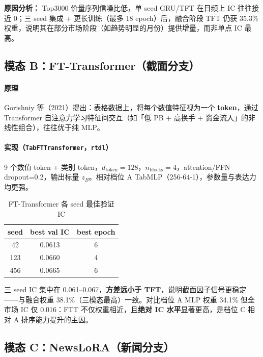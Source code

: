 \documentclass[UTF8,a4paper,12pt]{ctexart}
\begin{document}
\textbf{原因分析：} Top3000 价量序列信噪比低，单 seed GRU/TFT 在日频上 IC 往往接近 0；三 seed 集成 + 更长训练（最多 18 epoch）后，融合阶段 TFT 仍获 35.3\% 权重，说明其在部分市场阶段（如趋势明显的月份）提供增量，而非单点 IC 最高。

\subsection{模态 B：FT-Transformer（截面分支）}

\paragraph{原理}

Gorishniy 等（2021）提出：表格数据上，将每个数值特征视为一个 \textbf{token}，通过 Transformer 自注意力学习特征间交互（如「低 PB + 高换手 + 资金流入」的非线性组合），往往优于纯 MLP。

\paragraph{实现（\texttt{TabFTTransformer}，\texttt{rtdl}）}

9 个数值 token + 类别 token，$d_{\mathrm{token}}=128$，$n_{\mathrm{blocks}}=4$，attention/FFN dropout=0.2，输出标量 $z_B$。相对档位 A TabMLP（256-64-1），参数量与表达力均更强。

\begin{table}[H]
\centering
\caption{FT-Transformer 各 seed 最佳验证 IC}
\label{tab:ftt-seed}
\begin{tabular}{ccc}
\toprule
\textbf{seed} & \textbf{best val IC} & \textbf{best epoch} \\
\midrule
42  & 0.0613 & 6 \\
123 & 0.0660 & 4 \\
456 & 0.0665 & 6 \\
\bottomrule
\end{tabular}
\end{table}

三 seed IC 集中在 0.061--0.067，\textbf{方差远小于 TFT}，说明截面因子信号更稳定——与融合权重 38.1\%（三模态最高）一致。对比档位 A MLP 权重 34.1\% 但全市场 IC 仅 0.016：FTT 不仅权重相近，且\textbf{绝对 IC 水平}显著更高，是档位 C 相对 A 排序能力提升的主因。

\subsection{模态 C：NewsLoRA（新闻分支）}
\end{document}
